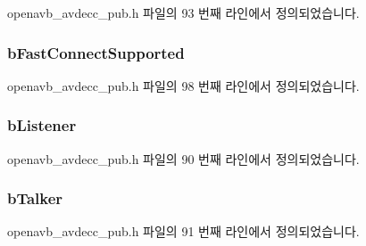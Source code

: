 openavb\+\_\+avdecc\+\_\+pub.\+h 파일의 93 번째 라인에서 정의되었습니다.

\subsubsection[{\texorpdfstring{b\+Fast\+Connect\+Supported}{bFastConnectSupported}}]{ b\+Fast\+Connect\+Supported}\hypertarget{structopenavb__avdecc__cfg__t_af2d13c6414749c36d13faf34d3bbbd40}{}\label{structopenavb__avdecc__cfg__t_af2d13c6414749c36d13faf34d3bbbd40}


openavb\+\_\+avdecc\+\_\+pub.\+h 파일의 98 번째 라인에서 정의되었습니다.

\subsubsection[{\texorpdfstring{b\+Listener}{bListener}}]{ b\+Listener}\hypertarget{structopenavb__avdecc__cfg__t_a23cf4651684018168a91628d6a3825ff}{}\label{structopenavb__avdecc__cfg__t_a23cf4651684018168a91628d6a3825ff}


openavb\+\_\+avdecc\+\_\+pub.\+h 파일의 90 번째 라인에서 정의되었습니다.

\subsubsection[{\texorpdfstring{b\+Talker}{bTalker}}]{ b\+Talker}\hypertarget{structopenavb__avdecc__cfg__t_a0d87b8d47bb02e4d8e93b056d72f870c}{}\label{structopenavb__avdecc__cfg__t_a0d87b8d47bb02e4d8e93b056d72f870c}


openavb\+\_\+avdecc\+\_\+pub.\+h 파일의 91 번째 라인에서 정의되었습니다.

